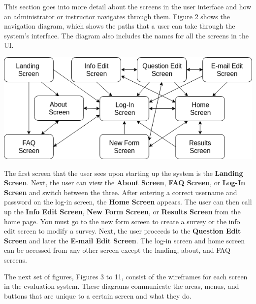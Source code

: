 \documentclass{article}
\begin{document}
This section goes into more detail about the screens in the user interface and how an administrator or instructor navigates through them. Figure 2 shows the navigation diagram, which shows the paths that a user can take through the system's interface. The diagram also includes the names for all the screens in the UI.

\begin{center}
\vspace{3mm}
{\includegraphics[width=6.5in]{images/navigation_diagram.png}}
\vspace{2mm}
\end{center} 

The first screen that the user sees upon starting up the system is the \textbf{Landing Screen}. Next, the user can view the \textbf{About Screen}, \textbf{FAQ Screen}, or  \textbf{Log-In Screen} and switch between the three. After entering a correct username and password on the log-in screen, the \textbf{Home Screen} appears. The user can then call up the \textbf{Info Edit Screen}, \textbf{New Form Screen}, or \textbf{Results Screen} from the home page. You must go to the new form screen to create a survey or the info edit screen to modify a survey. Next, the user proceeds to the \textbf{Question Edit Screen} and later the \textbf{E-mail Edit Screen}. The log-in screen and home screen can be accessed from any other screen except the landing, about, and FAQ screens.

The next set of figures, Figures 3 to 11, consist of the wireframes for each screen in the evaluation system. These diagrams communicate the areas, menus, and buttons that are unique to a certain screen and what they do.

\newpage
{}
\end{document}
